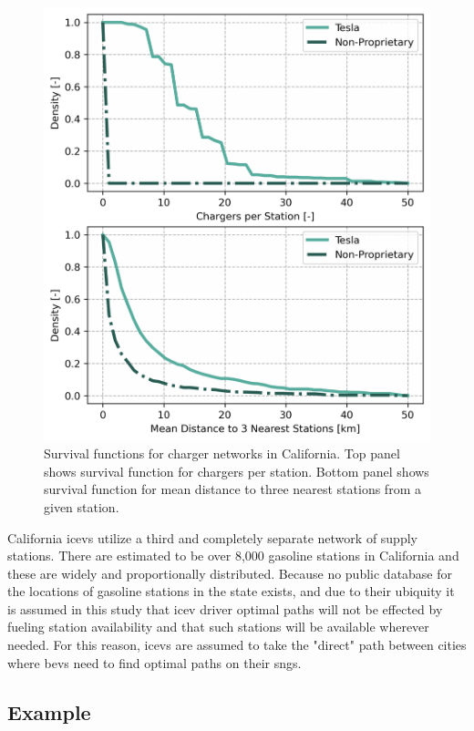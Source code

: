 \documentclass[11pt]{article}
\begin{document}
\begin{multicols}{2}
\begin{figure}[H]
	\centering
	\includegraphics[width = \linewidth]{figs/California_Charger_Network_Survival_Functions.png}
	\caption{Survival functions for charger networks in California. Top panel shows survival function for chargers per station. Bottom panel shows survival function for mean distance to three nearest stations from a given station.}
	\label{fig:network_histograms}
\end{figure}

California \glspl{icev} utilize a third and completely separate network of supply stations. There are estimated to be over 8,000 gasoline stations in California \cite{CEC_2022} and these are widely and proportionally distributed. Because no public database for the locations of gasoline stations in the state exists, and due to their ubiquity it is assumed in this study that \gls{icev} driver optimal paths will not be effected by fueling station availability and that such stations will be available wherever needed. For this reason, \glspl{icev} are assumed to take the "direct" path between cities where \glspl{bev} need to find optimal paths on their \glspl{sng}.

\subsection*{Example}


\end{multicols}
\end{document}
